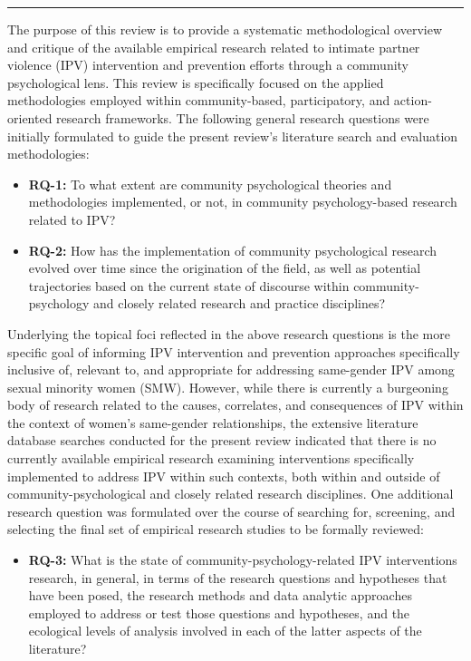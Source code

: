 \documentclass[11pt,]{tufte-book}
\providecommand{\tightlist}{%
  \setlength{\itemsep}{0pt}\setlength{\parskip}{0pt}}
\newcommand{\Frule}{
    \vspace*{-1em}
    \begin{fullwidth}\textcolor{blublk}{\rule{\linewidth}{0.2mm}}\end{fullwidth}
}
\begin{document}
\Frule

\normalsize{}

The purpose of this review is to provide a systematic methodological
overview and critique of the available empirical research related to
intimate partner violence (IPV) intervention and prevention efforts
through a community psychological lens. This review is specifically
focused on the applied methodologies employed within community-based,
participatory, and action-oriented research frameworks. The following
general research questions were initially formulated to guide the
present review's literature search and evaluation methodologies:

\singlespacing

\begin{itemize}
\item
  \textbf{RQ-1:} To what extent are community psychological theories and
  methodologies implemented, or not, in community psychology-based
  research related to IPV?
\item
  \textbf{RQ-2:} How has the implementation of community psychological
  research evolved over time since the origination of the field, as well
  as potential trajectories based on the current state of discourse
  within community-psychology and closely related research and practice
  disciplines?
\end{itemize}

\doublespacing

Underlying the topical foci reflected in the above research questions is
the more specific goal of informing IPV intervention and prevention
approaches specifically inclusive of, relevant to, and appropriate for
addressing same-gender IPV among sexual minority women (SMW). However,
while there is currently a burgeoning body of research related to the
causes, correlates, and consequences of IPV within the context of
women's same-gender relationships, the extensive literature database
searches conducted for the present review indicated that there is no
currently available empirical research examining interventions
specifically implemented to address IPV within such contexts, both
within and outside of community-psychological and closely related
research disciplines. One additional research question was formulated
over the course of searching for, screening, and selecting the final set
of empirical research studies to be formally reviewed:

\singlespacing

\begin{itemize}
\tightlist
\item
  \textbf{RQ-3:} What is the state of community-psychology-related IPV
  interventions research, in general, in terms of the research questions
  and hypotheses that have been posed, the research methods and data
  analytic approaches employed to address or test those questions and
  hypotheses, and the ecological levels of analysis involved in each of
  the latter aspects of the literature?
\end{itemize}
\end{document}
